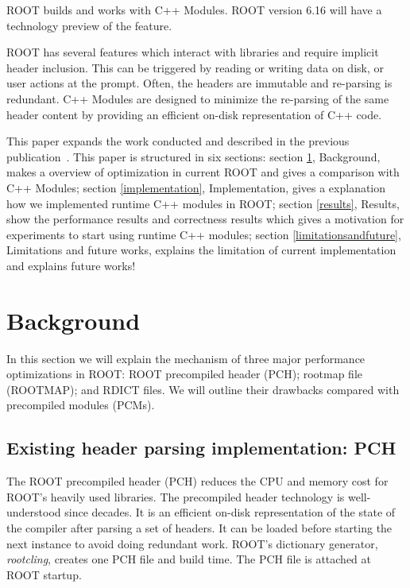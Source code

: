\documentclass{webofc}
\begin{document}
ROOT builds and works with C++ Modules. ROOT version 6.16 will have a technology preview of the feature.

ROOT has several features which interact with libraries and require implicit header inclusion. This can be triggered by reading or writing data on disk, or user actions at the prompt. Often, the headers are immutable and re-parsing is redundant. C++ Modules are designed to minimize the re-parsing of the same header content by providing an efficient on-disk representation of C++ code.

This paper expands the work conducted and described in the previous publication~\cite{vassil-paper}. This paper is structured in six sections: section \ref{background}, Background, makes a overview of optimization in current ROOT and gives a comparison with C++ Modules; section \ref{implementation}, Implementation, gives a explanation how we implemented runtime C++ modules in ROOT; section \ref{results}, Results, show the performance results and correctness results which gives a motivation for experiments to start using runtime C++ modules; section \ref{limitationsandfuture}, Limitations and future works, explains the limitation of current implementation and explains future works!

\section{Background}
\label{background}

In this section we will explain the mechanism of three major performance optimizations in ROOT: ROOT precompiled header (PCH); rootmap file (ROOTMAP); and RDICT files. We will outline their drawbacks compared with precompiled modules (PCMs).

\subsection{Existing header parsing implementation: PCH}
\label{pch}

The ROOT precompiled header (PCH) reduces the CPU and memory cost for ROOT’s heavily used libraries. The precompiled header technology is well-understood since decades. It is an efficient on-disk representation of the state of the compiler after parsing a set of headers. It can be loaded before starting the next instance to avoid doing redundant work. ROOT’s dictionary generator, \textit{rootcling}, creates one PCH file and build time. The PCH file is attached at ROOT startup.
\end{document}
